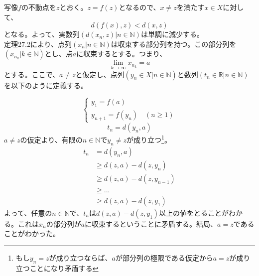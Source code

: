 \documentclass{jsarticle}
\begin{document}
\subsubsection{}
写像$f$の不動点を$z$とおく。$z=f(z)$となるので、$x\neq z$を満たす$x\in X$に対して、
\[d(f(x),z)<d(x,z)\]
となる。よって、実数列$(d(x_n,z)|n\in\mathbb{N})$は単調に減少する。\\
定理27.2により、点列$(x_n | n\in\mathbb{N})$は収束する部分列を持つ。この部分列を$(x_{n_k}|k\in\mathbb{N})$とし、点$a$に収束するとする。つまり、
\[\lim_{k\to\infty}x_{n_k}=a\]
とする。ここで、$a\neq z$と仮定し、点列$(y_n\in X|n\in\mathbb{N})$と数列$(t_n\in \mathbb{R}|n\in\mathbb{N})$を以下のように定義する。

\[
\begin{cases}
y_1=f(a)\\
y_{n+1}=f(y_n)\quad(n\geq 1)
\end{cases}
\]
\[
t_n=d(y_n,a)
\]
$a\neq z$の仮定より、有限の$n\in\mathbb{N}$で$y_{n}\neq z$が成り立つ\footnote{もし$y_n=z$が成り立つならば、$a$が部分列の極限である仮定から$a=z$が成り立つことになり矛盾する}。
\begin{align*}
t_{n}&=d(y_n,a)\\
&\geq d(z,a)-d(z,y_n)\\
&\geq d(z,a)-d(z,y_{n-1})\\
&\geq ...\\
&\geq d(z,a)-d(z,y_1)
\end{align*}
よって、任意の$n\in\mathbb{N}$で、$t_n$は$d(z,a)-d(z,y_1)$以上の値をとることがわかる。これは$x_n$の部分列が$a$に収束するということに矛盾する。結局、$a=z$であることがわかった。





































\newpage
\appendix
\end{document}
